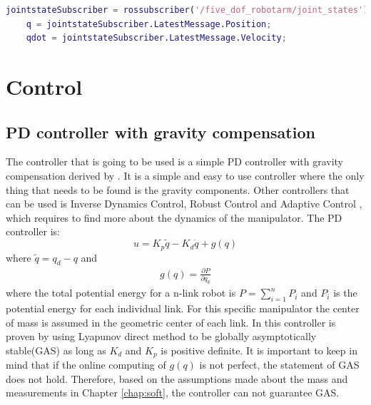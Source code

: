 \begin{lstlisting}[language=Matlab,caption={MATLAB code for the joint state subscriber},label={lst:matlabSubs}]
    jointstateSubscriber = rossubscriber('/five_dof_robotarm/joint_states');
    q = jointstateSubscriber.LatestMessage.Position;  
    qdot = jointstateSubscriber.LatestMessage.Velocity;
\end{lstlisting}














\section{Control}
\subsection{PD controller with gravity compensation}
The controller that is going to be used is a simple PD controller with gravity compensation derived by \cite{spong,Siciliano}. It is a simple and easy to use controller where the only thing that needs to be found is the gravity components. Other controllers that can be used is Inverse Dynamics Control, Robust Control and Adaptive Control \cite{spong,Siciliano}, which requires to find more about the dynamics of the manipulator. The PD controller is:
$$
    u=K_p\tilde{q} - K_d\dot{q} +g(q)
$$
 where $\tilde{q} = q_d - q$ and 
 \begin{align}\label{eq:gravity}
 g(q) = \frac{\partial P}{\partial q_k}
 \end{align}
 where the total potential energy for a n-link robot is $P = \sum^n_{i=1}P_i$ and $P_i$ is the potential energy for each individual link. For this specific manipulator the center of mass is assumed in the geometric center of each link. In \cite{Siciliano} this controller is proven by using Lyapunov direct method to be globally asymptotically stable(GAS) as long as $K_d$ and $K_p$ is positive definite. It is important to keep in mind that if the online computing of $g(q)$ is not perfect, the statement of GAS does not hold. Therefore, based on the assumptions made about the mass and measurements in Chapter \ref{chap:soft}, the controller can not guarantee GAS. 
 
